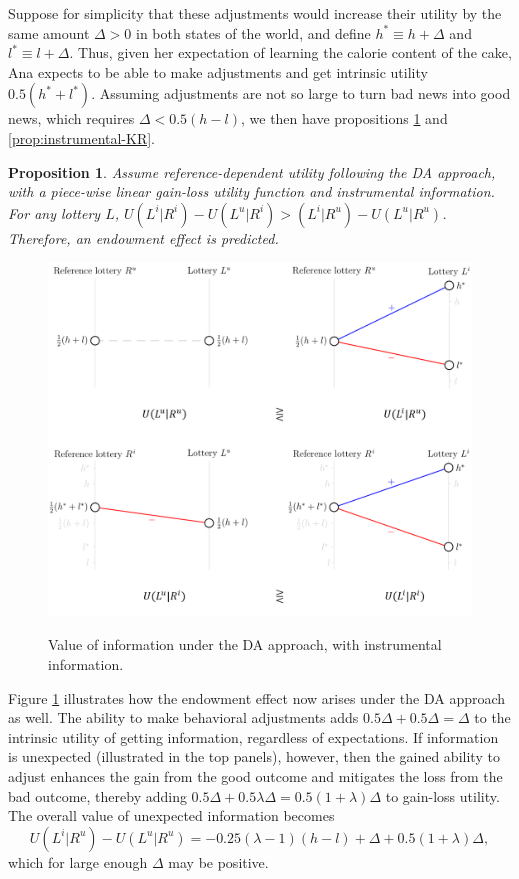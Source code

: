 \documentclass[12pt]{article}
\newtheorem{prop}{Proposition}
\begin{document}
Suppose for simplicity that these adjustments would increase their utility by the same amount $\Delta > 0$ in both states of the world, and define $h^* \equiv h+\Delta$ and $l^* \equiv l+\Delta$. Thus, given her expectation of learning the calorie content of the cake, Ana expects to be able to make adjustments and get intrinsic utility $0.5(h^*+l^*)$. Assuming adjustments are not so large to turn bad news into good news, which requires $\Delta <0.5(h-l)$, we then have propositions \ref{prop:instrumental-DA} and \ref{prop:instrumental-KR}.

\begin{prop}
  Assume reference-dependent utility following the DA approach, with a piece-wise linear gain-loss utility function and instrumental information. For any lottery $L$, $U(L^i|R^i)-U(L^u|R^i)>(L^i|R^u)-U(L^u|R^u)$. Therefore, an endowment effect is predicted.
  \label{prop:instrumental-DA}
\end{prop}

\begin{figure}[ht]
  \caption{Value of information under the DA approach, with instrumental information.}\label{fig:instrumental-DA}
  \begin{center}
  {\includegraphics[width=1\textwidth]{./figures/theory_fig3.png}}
  \end{center}
\end{figure}

Figure \ref{fig:instrumental-DA} illustrates how the endowment effect now arises under the DA approach as well. The ability to make behavioral adjustments adds $0.5 \Delta + 0.5 \Delta = \Delta$ to the intrinsic utility of getting information, regardless of expectations. If information is unexpected (illustrated in the top panels), however, then the gained ability to adjust enhances the gain from the good outcome and mitigates the loss from the bad outcome, thereby adding $0.5 \Delta + 0.5 \lambda \Delta = 0.5 (1 + \lambda) \Delta$ to gain-loss utility. The overall value of unexpected information becomes
\begin{equation*}
  U(L^i|R^u)-U(L^u|R^u)=-0.25(\lambda-1)(h-l)+\Delta +0.5(1+\lambda)\Delta,
\end{equation*}
which for large enough $\Delta$ may be positive.
\end{document}
